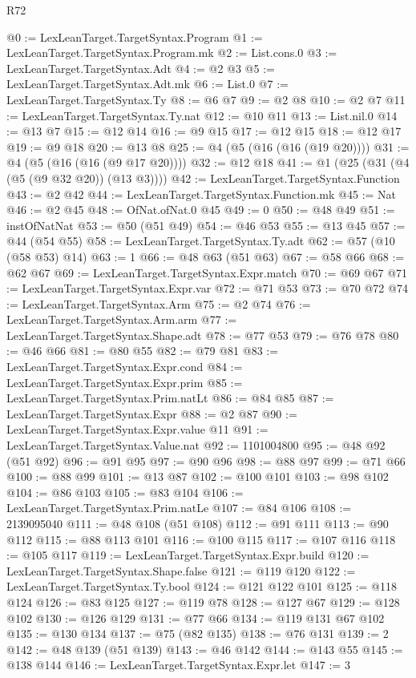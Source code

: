 \begin{lexlean}{R72}
\begin{coremodule}
@0 := LexLeanTarget.TargetSyntax.Program
@1 := LexLeanTarget.TargetSyntax.Program.mk
@2 := List.cons.{0}
@3 := LexLeanTarget.TargetSyntax.Adt
@4 := @2 @3
@5 := LexLeanTarget.TargetSyntax.Adt.mk
@6 := List.{0}
@7 := LexLeanTarget.TargetSyntax.Ty
@8 := @6 @7
@9 := @2 @8
@10 := @2 @7
@11 := LexLeanTarget.TargetSyntax.Ty.nat
@12 := @10 @11
@13 := List.nil.{0}
@14 := @13 @7
@15 := @12 @14
@16 := @9 @15
@17 := @12 @15
@18 := @12 @17
@19 := @9 @18
@20 := @13 @8
@25 := @4 (@5 (@16 (@16 (@19 @20))))
@31 := @4 (@5 (@16 (@16 (@9 @17 @20))))
@32 := @12 @18
@41 := @1 (@25 (@31 (@4 (@5 (@9 @32 @20)) (@13 @3))))
@42 := LexLeanTarget.TargetSyntax.Function
@43 := @2 @42
@44 := LexLeanTarget.TargetSyntax.Function.mk
@45 := Nat
@46 := @2 @45
@48 := OfNat.ofNat.{0} @45
@49 := 0
@50 := @48 @49
@51 := instOfNatNat
@53 := @50 (@51 @49)
@54 := @46 @53
@55 := @13 @45
@57 := @44 (@54 @55)
@58 := LexLeanTarget.TargetSyntax.Ty.adt
@62 := @57 (@10 (@58 @53) @14)
@63 := 1
@66 := @48 @63 (@51 @63)
@67 := @58 @66
@68 := @62 @67
@69 := LexLeanTarget.TargetSyntax.Expr.match
@70 := @69 @67
@71 := LexLeanTarget.TargetSyntax.Expr.var
@72 := @71 @53
@73 := @70 @72
@74 := LexLeanTarget.TargetSyntax.Arm
@75 := @2 @74
@76 := LexLeanTarget.TargetSyntax.Arm.arm
@77 := LexLeanTarget.TargetSyntax.Shape.adt
@78 := @77 @53
@79 := @76 @78
@80 := @46 @66
@81 := @80 @55
@82 := @79 @81
@83 := LexLeanTarget.TargetSyntax.Expr.cond
@84 := LexLeanTarget.TargetSyntax.Expr.prim
@85 := LexLeanTarget.TargetSyntax.Prim.natLt
@86 := @84 @85
@87 := LexLeanTarget.TargetSyntax.Expr
@88 := @2 @87
@90 := LexLeanTarget.TargetSyntax.Expr.value @11
@91 := LexLeanTarget.TargetSyntax.Value.nat
@92 := 1101004800
@95 := @48 @92 (@51 @92)
@96 := @91 @95
@97 := @90 @96
@98 := @88 @97
@99 := @71 @66
@100 := @88 @99
@101 := @13 @87
@102 := @100 @101
@103 := @98 @102
@104 := @86 @103
@105 := @83 @104
@106 := LexLeanTarget.TargetSyntax.Prim.natLe
@107 := @84 @106
@108 := 2139095040
@111 := @48 @108 (@51 @108)
@112 := @91 @111
@113 := @90 @112
@115 := @88 @113 @101
@116 := @100 @115
@117 := @107 @116
@118 := @105 @117
@119 := LexLeanTarget.TargetSyntax.Expr.build
@120 := LexLeanTarget.TargetSyntax.Shape.false
@121 := @119 @120
@122 := LexLeanTarget.TargetSyntax.Ty.bool
@124 := @121 @122 @101
@125 := @118 @124
@126 := @83 @125
@127 := @119 @78
@128 := @127 @67
@129 := @128 @102
@130 := @126 @129
@131 := @77 @66
@134 := @119 @131 @67 @102
@135 := @130 @134
@137 := @75 (@82 @135)
@138 := @76 @131
@139 := 2
@142 := @48 @139 (@51 @139)
@143 := @46 @142
@144 := @143 @55
@145 := @138 @144
@146 := LexLeanTarget.TargetSyntax.Expr.let
@147 := 3

\end{coremodule}
\end{lexlean}
